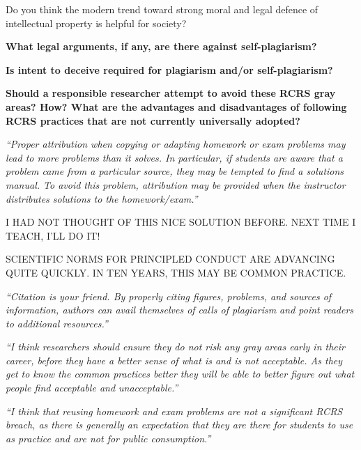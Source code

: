 \documentclass[portrait,11pt]{seminar}
\begin{document}
Do you think the modern trend toward strong moral and legal defence of intellectual property is helpful for society?

\es


\vspace{3cm}

{\bf What legal arguments, if any, are there against self-plagiarism?}

\es

\bs
{\bf Is intent to deceive required for plagiarism and/or self-plagiarism?}

\es

\bs
{\bf Should a responsible researcher attempt to avoid these RCRS gray areas? How? What are the advantages and disadvantages of following RCRS practices that are not currently universally adopted?}

{\it ``Proper attribution when copying or adapting homework or exam problems may lead to more problems than it solves. In particular, if students are aware that a problem came from a particular source, they may be tempted to find a solutions manual. To avoid this problem, attribution may be provided when the instructor distributes solutions to the homework/exam.''}

\medskip
I HAD NOT THOUGHT OF THIS NICE SOLUTION BEFORE. NEXT TIME I TEACH, I'LL DO IT!

\medskip
SCIENTIFIC NORMS FOR PRINCIPLED CONDUCT ARE ADVANCING QUITE QUICKLY. IN TEN YEARS, THIS MAY BE COMMON PRACTICE.

\es
\bs

{\it ``Citation is your friend. By properly citing figures, problems, and sources of information, authors can avail themselves of calls of plagiarism and point readers to additional resources.''}

\medskip

{\it ``I think researchers should ensure they do not risk any gray areas early in their career, before they have a better sense of what is and is not acceptable. As they get to know the common practices better they will be able to better figure out what people find acceptable and unacceptable.''}

\es
\bs

{\it ``I think that reusing homework and exam problems are not a significant RCRS breach, as there is generally an expectation that they are there for students to use as practice and are not for public consumption.''}
\end{document}
